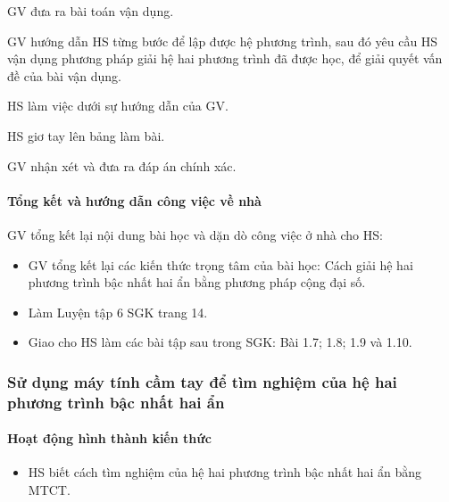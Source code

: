 \tochucthuchien

\begin{tcth}
    \buocmot
    \item GV đưa ra bài toán vận dụng.
    \item GV hướng dẫn HS từng bước để lập được hệ phương trình, sau đó yêu cầu HS vận dụng phương pháp giải hệ hai phương trình đã được học, để giải quyết vấn đề của bài vận dụng.
    \buochai
    \item HS làm việc dưới sự hướng dẫn của GV. 
    \buocba
    \item HS giơ tay lên bảng làm bài.
    \buocbon
    \item GV nhận xét và đưa ra đáp án chính xác.
\end{tcth}

\paragraph{Tổng kết và hướng dẫn công việc về nhà}

GV tổng kết lại nội dung bài học và dặn dò công việc ở nhà cho HS:
\begin{itemize}
    \item GV tổng kết lại các kiến thức trọng tâm của bài học: Cách giải hệ hai phương trình bậc nhất hai ẩn bằng phương pháp cộng đại số. 
    \item Làm Luyện tập 6 SGK trang 14. 
    \item Giao cho HS làm các bài tập sau trong SGK: Bài 1.7; 1.8; 1.9 và 1.10.
\end{itemize}

\subsubsection{Sử dụng máy tính cầm tay để tìm nghiệm của hệ hai phương trình bậc nhất hai ẩn}

\paragraph{Hoạt động hình thành kiến thức}

\muctieu

\begin{itemize}
    \item HS biết cách tìm nghiệm của hệ hai phương trình bậc nhất hai ẩn bằng MTCT. 
\end{itemize}

\noidungsanpham

